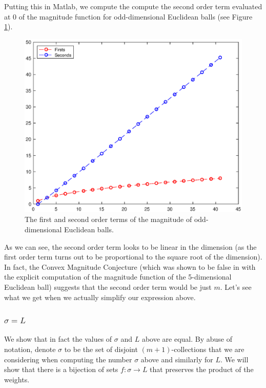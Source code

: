 \documentclass[11pt]{article}
\theoremstyle{definition}
\theoremstyle{definition}
\theoremstyle{plain}
\theoremstyle{plain}
\theoremstyle{plain}
\theoremstyle{definition}
\begin{document}
Putting this in Matlab, we compute the compute the second order term evaluated at 0 of the magnitude function for odd-dimensional Euclidean balls (see Figure \ref{fig:secs}).

\begin{figure}[h!]
\centerline{\includegraphics[width=12cm]{secs.eps}}\caption{The first and second order terms of the magnitude of odd-dimensional Euclidean balls.}\label{fig:secs}
\end{figure}

As we can see, the second order term looks to be linear in the dimension (as the first order term turns out to be proportional to the square root of the dimension). In fact, the Convex Magnitude Conjecture (which was shown to be false in \cite{barcelo_magnitudes_2016} with the explicit computation of the magnitude function of the 5-dimensional Euclidean ball) suggests that the second order term would be just $m$. Let's see what we get when we actually simplify our expression above.

\subsubsection*{$\sigma = L$}

We show that in fact the values of $\sigma$ and $L$ above are equal. By abuse of notation, denote $\sigma$ to be the set of disjoint $(m+1)$-collections that we are considering when computing the number $\sigma$ above and similarly for $L$. We will show that there is a bijection of sets $f:\sigma \to L$ that preserves the product of the weights.
\end{document}
